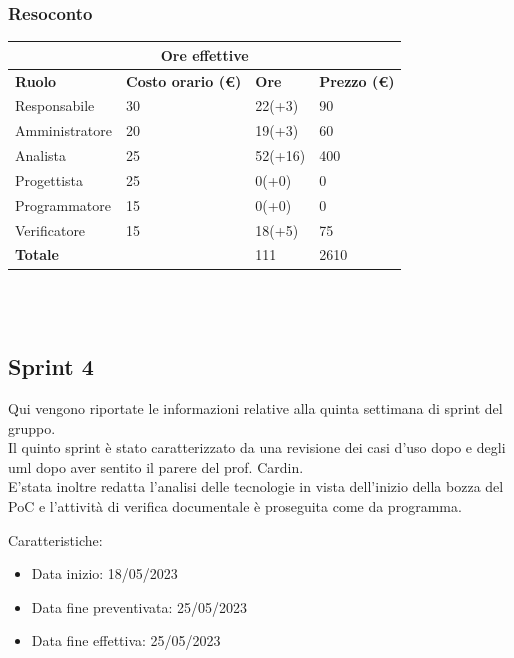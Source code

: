 \documentclass[9pt]{article}
\begin{document}
\subsubsection{Resoconto}
\begin{center}
	\begin{tabularx}{\textwidth}{|X|X|X|X|}
		\hline
		\multicolumn{4}{|c|}{\textbf{Ore effettive}}                                      \\
		\hline
		\hline
		\textbf{Ruolo}  & \textbf{Costo orario (\euro)} & \textbf{Ore} & \textbf{Prezzo (\euro)} \\
		\hline
		Responsabile    & 30                            & 22(+3)       & 90                      \\
		\hline
		Amministratore  & 20                            & 19(+3)       & 60                      \\
		\hline
		Analista        & 25                            & 52(+16)      & 400                     \\
		\hline
		Progettista     & 25                            & 0(+0)        & 0                       \\
		\hline
		Programmatore   & 15                            & 0(+0)        & 0                       \\
		\hline
		Verificatore    & 15                            & 18(+5)       & 75                      \\
		\hline
		\hline
		\textbf{Totale} &                               & 111          & 2610                    \\
		\hline
	\end{tabularx}\\[8pt]
	\mbox{}\\
\end{center}

\subsection{Sprint 4}
Qui vengono riportate le informazioni relative alla quinta settimana di sprint del gruppo. \\
Il quinto sprint è stato caratterizzato da una revisione dei casi d'uso dopo e degli uml dopo aver sentito il parere del prof. Cardin.\\
E'stata inoltre redatta l'analisi delle tecnologie in vista dell'inizio della bozza del PoC e l'attività di verifica documentale è proseguita come da programma.


Caratteristiche:
\begin{itemize}
	\item Data inizio: 18/05/2023
	\item Data fine preventivata: 25/05/2023
	\item Data fine effettiva: 25/05/2023
\end{itemize}
\end{document}
